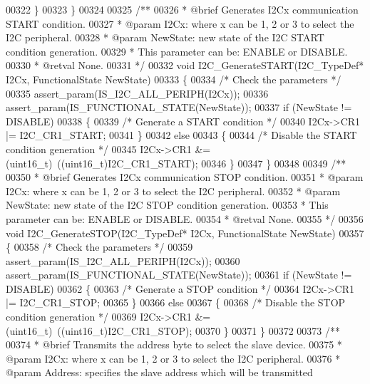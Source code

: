 \begin{DoxyCode}
00322   \}
00323 \}
00324 
00325 \textcolor{comment}{/**}
00326 \textcolor{comment}{  * @brief  Generates I2Cx communication START condition.}
00327 \textcolor{comment}{  * @param  I2Cx: where x can be 1, 2 or 3 to select the I2C peripheral.}
00328 \textcolor{comment}{  * @param  NewState: new state of the I2C START condition generation.}
00329 \textcolor{comment}{  *          This parameter can be: ENABLE or DISABLE.}
00330 \textcolor{comment}{  * @retval None.}
00331 \textcolor{comment}{  */}
00332 \textcolor{keywordtype}{void} I2C_GenerateSTART(I2C\_TypeDef* I2Cx, FunctionalState NewState)
00333 \{
00334   \textcolor{comment}{/* Check the parameters */}
00335   assert_param(IS\_I2C\_ALL\_PERIPH(I2Cx));
00336   assert_param(IS\_FUNCTIONAL\_STATE(NewState));
00337   \textcolor{keywordflow}{if} (NewState != DISABLE)
00338   \{
00339     \textcolor{comment}{/* Generate a START condition */}
00340     I2Cx->CR1 |= I2C_CR1_START;
00341   \}
00342   \textcolor{keywordflow}{else}
00343   \{
00344     \textcolor{comment}{/* Disable the START condition generation */}
00345     I2Cx->CR1 &= (uint16\_t)~((uint16\_t)I2C_CR1_START);
00346   \}
00347 \}
00348 
00349 \textcolor{comment}{/**}
00350 \textcolor{comment}{  * @brief  Generates I2Cx communication STOP condition.}
00351 \textcolor{comment}{  * @param  I2Cx: where x can be 1, 2 or 3 to select the I2C peripheral.}
00352 \textcolor{comment}{  * @param  NewState: new state of the I2C STOP condition generation.}
00353 \textcolor{comment}{  *          This parameter can be: ENABLE or DISABLE.}
00354 \textcolor{comment}{  * @retval None.}
00355 \textcolor{comment}{  */}
00356 \textcolor{keywordtype}{void} I2C_GenerateSTOP(I2C\_TypeDef* I2Cx, FunctionalState NewState)
00357 \{
00358   \textcolor{comment}{/* Check the parameters */}
00359   assert_param(IS\_I2C\_ALL\_PERIPH(I2Cx));
00360   assert_param(IS\_FUNCTIONAL\_STATE(NewState));
00361   \textcolor{keywordflow}{if} (NewState != DISABLE)
00362   \{
00363     \textcolor{comment}{/* Generate a STOP condition */}
00364     I2Cx->CR1 |= I2C_CR1_STOP;
00365   \}
00366   \textcolor{keywordflow}{else}
00367   \{
00368     \textcolor{comment}{/* Disable the STOP condition generation */}
00369     I2Cx->CR1 &= (uint16\_t)~((uint16\_t)I2C_CR1_STOP);
00370   \}
00371 \}
00372 
00373 \textcolor{comment}{/**}
00374 \textcolor{comment}{  * @brief  Transmits the address byte to select the slave device.}
00375 \textcolor{comment}{  * @param  I2Cx: where x can be 1, 2 or 3 to select the I2C peripheral.}
00376 \textcolor{comment}{  * @param  Address: specifies the slave address which will be transmitted}

\end{DoxyCode}
